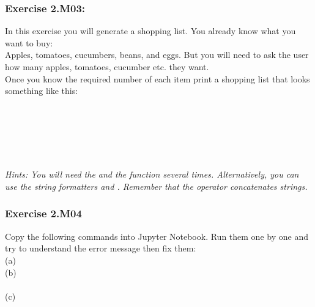 

\subsubsection*{Exercise 2.M03:}
In this exercise you will generate a shopping list. You already know what you want to buy:\\
Apples, tomatoes, cucumbers, beans, and eggs. But you will need to ask the user how many apples, tomatoes, cucumber etc. they want.\\
Once you know the required number of each item print a shopping list that looks something like this:\\


{}\\
\\
\\
\\
\\
\\


\textit{Hints:
You will need the {} and the {} function several times. Alternatively, you can use the string formatters {} and {}. Remember that the \code{+} operator concatenates strings.}\\[1cm]




\subsubsection*{Exercise 2.M04}
Copy the following commands into Jupyter Notebook. Run them one by one and try to
understand the error message then fix them:\\

\hspace*{5mm}(a) {}\\
\hspace*{5mm}(b) {}\\
\\
\hspace*{5mm}(c) {}\\
\\
\\


